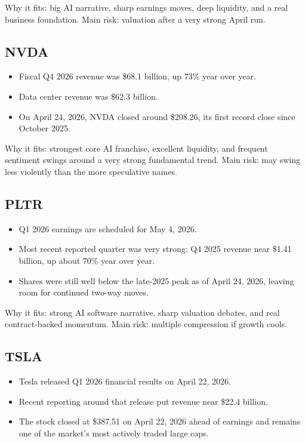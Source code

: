 \documentclass[11pt]{article}
\begin{document}
Why it fits: big AI narrative, sharp earnings moves, deep liquidity, and a real business foundation. Main risk: valuation after a very strong April run.

\subsection*{NVDA}

\begin{itemize}
  \item Fiscal Q4 2026 revenue was \$68.1 billion, up 73\% year over year.
  \item Data center revenue was \$62.3 billion.
  \item On April 24, 2026, NVDA closed around \$208.26, its first record close since October 2025.
\end{itemize}

Why it fits: strongest core AI franchise, excellent liquidity, and frequent sentiment swings around a very strong fundamental trend. Main risk: may swing less violently than the more speculative names.

\subsection*{PLTR}

\begin{itemize}
  \item Q1 2026 earnings are scheduled for May 4, 2026.
  \item Most recent reported quarter was very strong: Q4 2025 revenue near \$1.41 billion, up about 70\% year over year.
  \item Shares were still well below the late-2025 peak as of April 24, 2026, leaving room for continued two-way moves.
\end{itemize}

Why it fits: strong AI software narrative, sharp valuation debates, and real contract-backed momentum. Main risk: multiple compression if growth cools.

\subsection*{TSLA}

\begin{itemize}
  \item Tesla released Q1 2026 financial results on April 22, 2026.
  \item Recent reporting around that release put revenue near \$22.4 billion.
  \item The stock closed at \$387.51 on April 22, 2026 ahead of earnings and remains one of the market's most actively traded large caps.
\end{itemize}
\end{document}
